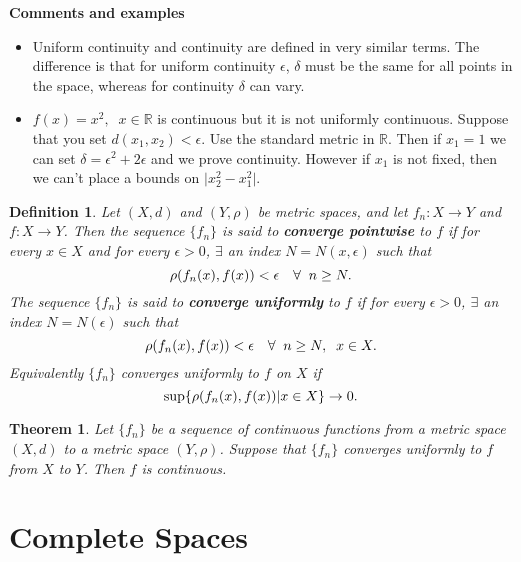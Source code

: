 \documentclass[two column]{article}
\newtheorem{theorem}{Theorem}[subsection]
\newtheorem{definition}{Definition}[subsection]
\begin{document}
{\bf Comments and examples}
\begin{itemize}
\item Uniform continuity and continuity are defined in very similar terms. The difference is that for uniform continuity $\epsilon$, $\delta$ must be the same for all points in the space, whereas for continuity $\delta$ can vary. 
\item $f(x) = x^{2}, \;\; x \in \mathbb{R}$ is continuous but it is not uniformly continuous. Suppose that you set $d(x_{1},x_{2}) < \epsilon$. Use the standard metric in $\mathbb{R}$. Then if $x_{1} = 1$ we can set $\delta =\epsilon^{2} + 2\epsilon$ and we prove continuity. However if $x_{1}$ is not fixed, then we can't place a bounds on $\lvert x_{2}^{2} - x_{1}^{2} \rvert$. \\
\end{itemize}

\begin{definition}
Let $(X,d)$ and $(Y,\rho)$ be metric spaces, and let $f_{n}:X \rightarrow Y$ and $f:X \rightarrow Y$. Then the sequence $\{ f_{n} \}$ is said to {\bf converge pointwise} to $f$ if for every $x \in X$ and for every $\epsilon > 0$, $\exists$ an index $N=N(x, \epsilon)$ such that \vspace{-6pt}
\[ \rho(f_{n}(x), f(x)) < \epsilon \quad \forall \;\; n \geq N. \vspace{-6pt} \]
The sequence $\{ f_{n} \}$ is said to {\bf converge uniformly} to $f$ if for every $\epsilon > 0$, $\exists$ an index $N=N(\epsilon)$ such that \vspace{-6pt} 
\[ \rho(f_{n}(x), f(x)) < \epsilon \quad \forall \;\; n \geq N, \;\; x \in X. \vspace{-6pt} \]
Equivalently $\{ f_{n} \}$ converges uniformly to $f$ on $X$ if \vspace{-6pt} 
\[ \sup \{ \rho(f_{n}(x), f(x)) \vert x\in X \} \rightarrow 0. \vspace{+6pt} \]
\end{definition}

\begin{theorem}
Let $\{ f_{n} \}$ be a sequence of \emph{continuous functions} from a metric space $(X,d)$ to a metric space $(Y,\rho)$. Suppose that $\{ f_{n} \}$ converges uniformly to $f$ from $X$ to $Y$. Then $f$ is continuous. 
\end{theorem}

\section{Complete Spaces}
\end{document}
